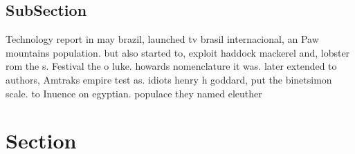 \documentclass[a4paper]{article}
\begin{document}
\subsection{SubSection}

Technology report in may brazil, launched tv brasil internacional, an Paw mountains population. but also started to, exploit haddock mackerel and, lobster rom the s. Festival the o luke. howards nomenclature it was. later extended to authors, Amtraks empire test as. idiots henry h goddard, put the binetsimon scale. to Inuence on egyptian. populace they named eleuther

\section{Section}
\end{document}
